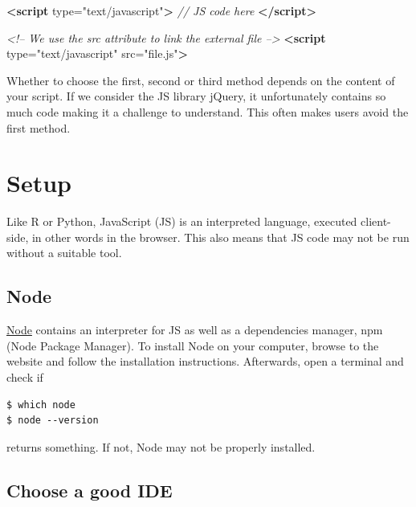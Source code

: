 \documentclass[
]{book}
\newenvironment{Shaded}{\begin{snugshade}}{\end{snugshade}}
\newcommand{\CommentTok}[1]{\textcolor[rgb]{0.56,0.35,0.01}{\textit{#1}}}
\newcommand{\KeywordTok}[1]{\textcolor[rgb]{0.13,0.29,0.53}{\textbf{#1}}}
\newcommand{\OtherTok}[1]{\textcolor[rgb]{0.56,0.35,0.01}{#1}}
\newcommand{\StringTok}[1]{\textcolor[rgb]{0.31,0.60,0.02}{#1}}
\begin{document}
\begin{Shaded}
\begin{Highlighting}[]
\KeywordTok{<script}\OtherTok{ type=}\StringTok{"text/javascript"}\KeywordTok{>}
\CommentTok{// JS code here}
\KeywordTok{</script>}
\end{Highlighting}
\end{Shaded}

\begin{Shaded}
\begin{Highlighting}[]
\CommentTok{<!-- We use the src attribute to link the external file -->}
\KeywordTok{<script}\OtherTok{ type=}\StringTok{"text/javascript"}\OtherTok{ src=}\StringTok{"file.js"}\KeywordTok{>}
\end{Highlighting}
\end{Shaded}

Whether to choose the first, second or third method depends on the content of your script. If we consider the JS library jQuery, it unfortunately contains so much code making it a challenge to understand. This often makes users avoid the first method.

\hypertarget{setup}{%
\section{Setup}\label{setup}}

Like R or Python, JavaScript (JS) is an interpreted language, executed client-side, in other words in the browser. This also means that JS code may not be run without a suitable tool.

\hypertarget{node}{%
\subsection{Node}\label{node}}

\href{https://nodejs.org/en/}{Node} contains an interpreter for JS as well as a dependencies manager, npm (Node Package Manager). To install Node on your computer, browse to the website and follow the installation instructions. Afterwards, open a terminal and check if

\begin{verbatim}
$ which node
$ node --version
\end{verbatim}

returns something. If not, Node may not be properly installed.

\hypertarget{choose-a-good-ide}{%
\subsection{Choose a good IDE}\label{choose-a-good-ide}}
\end{document}
